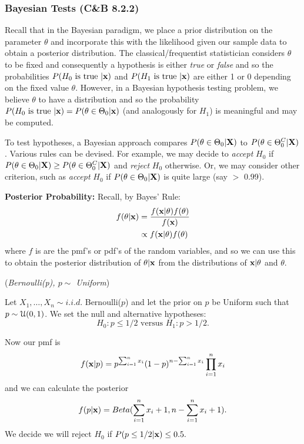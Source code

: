 \documentclass[11pt,]{article}
\def\bx{{\bf x}}
\def\bX{{\bf X}}
\def\Usc{{\cal U}}
\def\sumin{\sum_{i=1}^n}
\begin{document}
\hypertarget{bayesian-tests-cb-8.2.2}{%
\subsubsection{Bayesian Tests (C\&B
8.2.2)}\label{bayesian-tests-cb-8.2.2}}

Recall that in the Bayesian paradigm, we place a prior distribution on
the parameter \(\theta\) and incorporate this with the likelihood given
our sample data to obtain a posterior distribution. The
classical/frequentist statistician considers \(\theta\) to be fixed and
consequently a hypothesis is either \emph{true} or \emph{false} and so
the probabilities \(P(H_0 \mbox{ is true } | \bx)\) and
\(P(H_1 \mbox{ is true } | \bx)\) are either 1 or 0 depending on the
fixed value \(\theta\). However, in a Bayesian hypothesis testing
problem, we believe \(\theta\) to have a distribution and so the
probability
\(P(H_0 \mbox{ is true } | \bx) = P(\theta \in \Theta_0 | \bx)\) (and
analogously for \(H_1\)) is meaningful and may be computed.

To test hypotheses, a Bayesian approach compares
\(P(\theta \in \Theta_0 | \bX)\) to \(P(\theta \in \Theta^C_0|\bX)\).
Various rules can be devised. For example, we may decide to
\emph{accept} \(H_0\) if
\(P(\theta \in \Theta_0|\bX) \geq P(\theta \in \Theta_0^C|\bX)\) and
\emph{reject} \(H_0\) otherwise. Or, we may consider other criterion,
such as \emph{accept} \(H_0\) if \(P(\theta \in \Theta_0|\bX)\) is quite
large (say \(>\) 0.99).

\noindent \textbf{Posterior Probability:} Recall, by Bayes' Rule:
\begin{align*}
f(\theta | \bx) &= \frac{f(\bx | \theta) f(\theta)}{f(\bx)}\\
&\propto f(\bx | \theta) f(\theta)
\end{align*} where \(f\) is are the pmf's or pdf's of the random
variables, and so we can use this to obtain the posterior distribution
of \(\theta | \bx\) from the distributions of \(\bx | \theta\) and
\(\theta\).

 (\emph{Bernoulli(p), \(p \sim\) Uniform})

Let \(X_1, \ldots, X_n \sim i.i.d.\) Bernoulli(\(p\)) and let the prior
on \(p\) be Uniform such that \(p\sim\Usc(0,1)\). We set the null and
alternative hypotheses: \[
H_0: p\leq 1/2 \mbox{ versus } H_1: p > 1/2.
\]

Now our pmf is
\[f(\bx | p) = p^{\sumin x_i}(1-p)^{n-\sumin x_i} \prod_{i=1}^n x_i\]
and we can calculate the posterior
\[f(p|\bx) = Beta(\sumin x_i + 1, n-\sumin x_i + 1).\] We decide we will
reject \(H_0\) if \(P(p\leq 1/2 |\bx) \leq 0.5.\)
\end{document}

